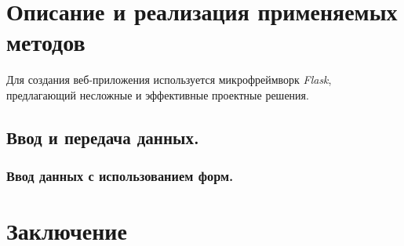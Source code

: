 \documentclass[a4paper]{article}
\begin{document}
\section{Описание и реализация применяемых методов}

Для создания веб-приложения используется микрофреймворк \emph{Flask}, предлагающий несложные и эффективные проектные решения.

\subsection{Ввод и передача данных.}

\subsubsection{Ввод данных с использованием форм.}



\section{Заключение}
\end{document}
